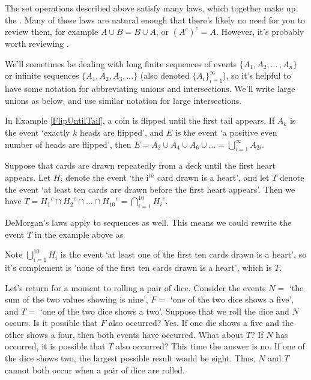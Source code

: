 \par
The set operations described above satisfy many laws, which together make up the . Many of these laws are natural enough that there's likely no need for you to review them, for example $A \cup B = B \cup A$, or $(A^{c})^{c} = A$. However, it's probably worth reviewing . 
\par 
We'll sometimes be dealing with long finite sequences of events $\{A_1, A_2, ...\,, A_n\}$ or infinite sequences $\{A_1, A_2, A_3, ...\}$ (also denoted $\{A_i\}_{i=1}^{\infty}$), so it's helpful to have some notation for abbreviating unions and intersections. We'll write large unions as below, and use similar notation for large intersections.
\par
\begin{examp}
In Example \ref{FlipUntilTail}, a coin is flipped until the first tail appears. If $A_k$ is the event `exactly $k$ heads are flipped', and $E$ is the event `a positive even number of heads are flipped', then $E = A_2 \cup A_4 \cup A_6 \cup ... = \bigcup_{i=1}^{\infty} A_{2i}$.
\end{examp}
\begin{examp}
Suppose that cards are drawn repeatedly from a deck until the first heart appears. Let $H_i$ denote the event `the i$^{th}$ card drawn is a heart', and let $T$ denote the event `at least ten cards are drawn before the first heart appears'. Then we have $T = {H_1}^c \cap {H_2}^c \cap ... \cap {H_{10}}^c = \bigcap_{i=1}^{10} {H_i}^c$. 
\end{examp}
\rmk DeMorgan's laws apply to sequences as well. This means we could rewrite the event $T$ in the example above as
\par
\noindent Note $\bigcup_{i=1}^{10}H_i$ is the event `at least one of the first ten cards drawn is a heart', so it's complement is `none of the first ten cards drawn is a heart', which is $T$.
\par
Let's return for a moment to rolling a pair of dice. Consider the events $N =$ `the sum of the two values showing is nine', $F =$ `one of the two dice shows a five', and $T = $ `one of the two dice shows a two'. Suppose that we roll the dice and $N$ occurs. Is it possible that $F$ also occurred? Yes. If one die shows a five and the other shows a four, then both events have occurred. What about $T$? If $N$ has occurred, it is possible that $T$ also occurred? This time the answer is no. If one of the dice shows two, the largest possible result would be eight. Thus, $N$ and $T$ cannot both occur when a pair of dice are rolled.
